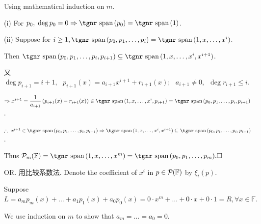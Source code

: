 \documentclass[a4paper, 11pt, UTF8]{article}
\def\Spn{{\textup{\tgnr span}}\,}
\def\Fbb{{\mathbb{F}}}
\def\Endi{\hspace{-2.5pt}}
\def\Hi{\quad\hspace{6.5pt}}
\def\Or{{\large O{\footnotesize R.} }}
\begin{document}
\begin{large}
\par\quad
{\Large\vspace{4pt}Using mathematical induction on $m$.}\par\quad
(i) {\Large\vspace{8pt}For $p_0,\;\deg p_0=0\Rightarrow\Spn(p_0)=\Spn(1)$.}\par\quad\Endi
(ii) {\Large\vspace{4pt}Suppose for $i\geq 1,\Spn(p_0,p_1,\dots,p_i)=\Spn(1,x,\dots,x^i)$.}\par\quad\Hi
{\Large\vspace{4pt}Then $\Spn(p_0,p_1,\dots,p_i,p_{i+1})\subseteq\Spn(1,x,\dots,x^i,x^{i+1})$.}\par\quad\Hi
又 {\Large\vspace{4pt}$\deg p_{i+1}=i+1,\,\,\,\,p_{i+1}(x)=a_{i+1}x^{i+1}+r_{i+1}(x);\,\,\,\,a_{i+1}\neq 0,\,\,\,\deg r_{i+1}\leq i.$}
\par\vspace{2pt}\quad\Hi
{\Large\vspace{4pt}$\Rightarrow x^{i+1}=\displaystyle\frac{1}{a_{i+1}}\left(p_{i+1}(x)-r_{i+1}(x)\right)\in\Spn(1,x,\dots,x^i,p_{i+1})=\Spn(p_0,p_1,\dots,p_i,p_{i+1})$.}\par\vspace{2pt}\quad\Hi
{\Large\vspace{8pt}$\therefore\,\,x^{i+1}\in\Spn(p_0,p_1,\dots,p_i,p_{i+1})\Rightarrow\Spn(1,x,\dots,x^i,x^{i+1})\subseteq\Spn(p_0,p_1,\dots,p_i,p_{i+1})$.}\par\quad
{\Large\vspace{4pt}Thus $\PoF{m}=\Spn(1,x,\dots,x^m)=\Spn(p_0,p_1,\dots,p_m).\hfill\square$}\vspace{14pt}\par\quad
\Or 用比较系数法. {\Large\vspace{4pt}Denote the coefficient of $x^i$ in $p\in\PoF{}$ by $\xi_i(p).$}\par\quad
{\Large\vspace{4pt}Suppose $L=a_m p_m(x)+\dots+a_1 p_1(x)+a_0p_0(x)=0\cdot x^m+\dots+0\cdot x+0\cdot 1=R,\forall x\in\Fbb.$}\par\quad
{\Large\vspace{4pt}We use induction on $m$ to show that $a_m=\dots=a_0=0.$}\par\quad

\end{large}
\end{document}
